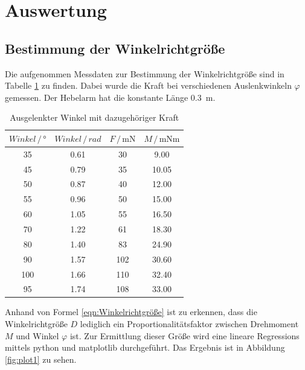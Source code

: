 \section{Auswertung}
\label{sec:Auswertung}

\subsection{Bestimmung der Winkelrichtgröße}

Die aufgenommen Messdaten zur Bestimmung der Winkelrichtgröße sind in Tabelle \ref{tab:Messdaten1}
zu finden. Dabei wurde die Kraft bei verschiedenen Auslenkwinkeln $\varphi$ gemessen. Der Hebelarm
hat die konstante Länge \SI{0.3}{\meter}.

\begin{table}
\centering
\caption{Ausgelenkter Winkel mit dazugehöriger Kraft}
\label{tab:Messdaten1}
\begin{tabular}{c c c c}
\toprule
$Winkel \,/\, °$ & $Winkel \,/\, rad$ & $F \,/\, \si{\milli\newton}$ & $M \,/\, \si{\milli\newton\meter}$\\
\midrule
 35 & 0.61 &  30 &  9.00\\
 45 & 0.79 &  35 & 10.05\\
 50 & 0.87 &  40 & 12.00\\
 55 & 0.96 &  50 & 15.00\\
 60 & 1.05 &  55 & 16.50\\
 70 & 1.22 &  61 & 18.30\\
 80 & 1.40 &  83 & 24.90\\
 90 & 1.57 & 102 & 30.60\\
100 & 1.66 & 110 & 32.40\\
 95 & 1.74 & 108 & 33.00\\
\bottomrule
\end{tabular}
\end{table}

Anhand von Formel \eqref{eqn:Winkelrichtgröße} ist zu erkennen, dass die Winkelrichtgröße $D$ 
lediglich ein Proportionalitätsfaktor zwischen Drehmoment $M$ und Winkel $\varphi$ ist. Zur Ermittlung 
dieser Größe wird eine lineare Regressions mittels python und matplotlib durchgeführt. 
Das Ergebnis ist in Abbildung \ref{fig:plot1} zu sehen. 



